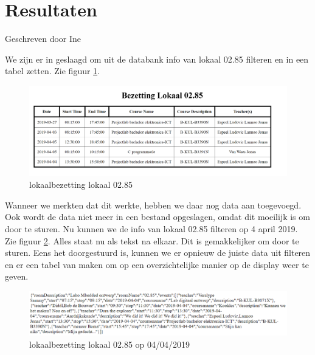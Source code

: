 \documentclass[a4paper,kul]{kulakarticle} %
\begin{document}
\newpage

\section{Resultaten}
{\scriptsize Geschreven door Ine}
\newline

We zijn er in geslaagd om uit de databank info van lokaal 02.85 filteren en in een tabel zetten. Zie figuur \ref{fig:vboutput}.
\newline

\begin{figure}[h]
	\centering
	\includegraphics[width=1\textwidth]{vbDatabank}
	\caption{lokaalbezetting lokaal 02.85}
	\label{fig:vboutput}
\end{figure}

Wanneer we merkten dat dit werkte, hebben we daar nog data aan toegevoegd. Ook wordt de data niet meer in een bestand opgeslagen, omdat dit moeilijk is om door te sturen. Nu kunnen we de info van lokaal 02.85 filteren op 4 april 2019. Zie figuur \ref{fig:vbdata}. Alles staat nu als tekst na elkaar. Dit is gemakkelijker om door te sturen. Eens het doorgestuurd is, kunnen we er opnieuw de juiste data uit filteren en er een tabel van maken om op een overzichtelijke manier op de display weer te geven.
\newline

\begin{figure}[h]
	\centering
	\includegraphics[width=1\textwidth]{vbData02_85}
	\caption{lokaalbezetting lokaal 02.85 op 04/04/2019}
	\label{fig:vbdata}
\end{figure}
\end{document}
